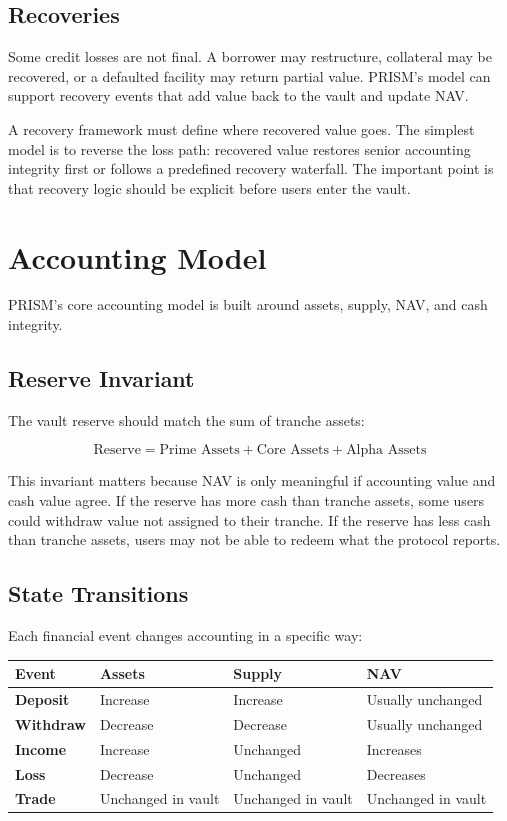 \documentclass[11pt]{article}
\begin{document}
\subsection{Recoveries}

Some credit losses are not final. A borrower may restructure, collateral may be
recovered, or a defaulted facility may return partial value. PRISM's model can
support recovery events that add value back to the vault and update NAV.

A recovery framework must define where recovered value goes. The simplest model
is to reverse the loss path: recovered value restores senior accounting
integrity first or follows a predefined recovery waterfall. The important point
is that recovery logic should be explicit before users enter the vault.

\section{Accounting Model}

PRISM's core accounting model is built around assets, supply, NAV, and cash
integrity.

\subsection{Reserve Invariant}

The vault reserve should match the sum of tranche assets:

\[
\text{Reserve} =
\text{Prime Assets} + \text{Core Assets} + \text{Alpha Assets}
\]

This invariant matters because NAV is only meaningful if accounting value and
cash value agree. If the reserve has more cash than tranche assets, some users
could withdraw value not assigned to their tranche. If the reserve has less cash
than tranche assets, users may not be able to redeem what the protocol reports.

\subsection{State Transitions}

Each financial event changes accounting in a specific way:

\begin{center}
\begin{tabular}{>{\bfseries}p{}p{}p{}p{}}
\toprule
Event & Assets & Supply & NAV \\
\midrule
Deposit & Increase & Increase & Usually unchanged \\
Withdraw & Decrease & Decrease & Usually unchanged \\
Income & Increase & Unchanged & Increases \\
Loss & Decrease & Unchanged & Decreases \\
Trade & Unchanged in vault & Unchanged in vault & Unchanged in vault \\
\bottomrule
\end{tabular}
\end{center}
\end{document}
